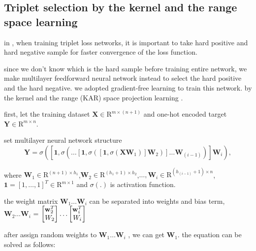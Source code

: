 \documentclass[runningheads]{llncs}
\begin{document}
\subsection{Triplet selection by the kernel and the range space learning}

in \cite{schroff2015facenet}, when training triplet loss networks, it is important to take hard positive and hard negative sample for faster convergence of the loss function.

since we don't know which is the hard sample before training entire network, we make multilayer feedforward neural network instead to select the hard positive and the hard negative.
we adopted gradient-free learning to train this network. by the kernel and the range (KAR) space projection learning \cite{toh2018learning,toh2018gradient}.

first, let the training dataset $\mathbf{X}\in{\mathrm{R}}^{m \times (n+1)}$ and one-hot encoded target $\mathbf{Y}\in{\mathrm{R}}^{m \times n}$. 

set multilayer neural network structure 
\begin{equation}
\mathbf{Y} = \sigma\left(\left[\mathbf{1},\sigma\left(\dots\left[\mathbf{1},\sigma\left(\left[\mathbf{1},\sigma\left(\mathbf{X}\mathbf{W}_{1}\right)\right]\mathbf{W}_{2}\right)\right]\dots\mathbf{W}_{(i-1)}\right)\right]\mathbf{W}_{i}\right),
\end{equation}

where $\mathbf{W}_{1}\in{\mathrm{R}}^{(n+1) \times h_{1}}$,$\mathbf{W}_{2}\in{\mathrm{R}}^{(h_{1}+1) \times h_{2}}$,$\dots,\mathbf{W}_{i}\in{\mathrm{R}}^{(h_{(i-1)}+1) \times n}$,
$\mathbf{1}=\left[1,\dots,1\right]^{T}\in{\mathrm{R}}^{m \times 1}$
and $\sigma(.)$ is activation function.

the weight matrix $\mathbf{W}_{1}\dots\mathbf{W}_{i}$ can be separated into weights and bias term,
$\mathbf{W}_{2}\dots\mathbf{W}_{i}$ = 
$\begin{bmatrix}
\mathbf{w}_{2}^{T}\\\mathnormal{W}_{2}
\end{bmatrix}
\dots
\begin{bmatrix}
\mathbf{w}_{i}^{T}\\\mathnormal{W}_{i}
\end{bmatrix}$

after assign random weights to $\mathbf{W}_{1}\dots\mathbf{W}_{i}$ , we can get $\mathbf{W}_{1}$. the equation can be solved as follows:
\end{document}
